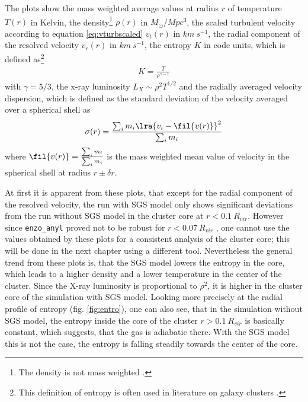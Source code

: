 The plots show the mass weighted average values at radius $r$ of temperature
$T(r)$ in Kelvin, the density\footnote{The density is not mass weighted
.} $\rho(r)$ in $\unit{M_{\odot}/Mpc^3}$, the scaled turbulent velocity
according to equation \eqref{eq:vturbscaled} $v_t(r)$ in $\unit{km\ s^{-1}}$,
the radial component of the resolved velocity $v_r(r)$ in $\unit{km\ s^{-1}}$,
the entropy $K$ in code units, which is defined as\footnote{This definition of
entropy is often used in literature on galaxy clusters
\citep{Voit2005,Iapichino2008}.}
\begin{align}
K=\frac{T}{\rho^{\gamma-1}}
\end{align}
with $\gamma = 5/3$, the x-ray luminosity $L_X \sim \rho^2 T^{1/2}$ and the
radially averaged velocity dispersion, which is defined as the standard
deviation of the velocity averaged over a spherical shell as
\begin{align}
\sigma(r) = \frac{\sum_i m_i \lra{v_i - \fil{v(r)}}^2}{\sum_i m_i} 
\end{align}
where $\fil{v(r)} = \frac{\sum_i m_i}{\sum_i m_i}$ is the mass weighted mean
value of velocity in the spherical shell at radius $r \pm \delta r$. 

At first it is apparent from these plots, that except for the radial
component of the resolved velocity, the run with SGS model only shows
significant deviations from the run without SGS model in the cluster core at
$r<0.1\ R_{vir}$. However since \texttt{enzo\_anyl} proved not to be
robust for 
$r< 0.07\ R_{vir}$ \citep{Iapichino2008}, one cannot use the values
obtained by these plots for a consistent analysis of the cluster core; this
will be done in the next chapter using a different tool.
Nevertheless the general trend from these plots is, that the SGS model lowers
the entropy in the core, which leads to a higher density and a lower
temperature in the center of the cluster. Since the X-ray luminosity is
proportional to $\rho^2$, it is higher in the cluster core of the simulation
with SGS model. Looking more precisely at the radial profile of entropy
(fig. \ref{fig:entro}), one can also see, that in the simulation without SGS
model, the entropy inside the core of the cluster $r > 0.1\ R_{vir}$ is
basically constant, which suggests, that the gas is adiabatic there. With the
SGS model this is not the case, the entropy is falling steadily towards the
center of the core. 

